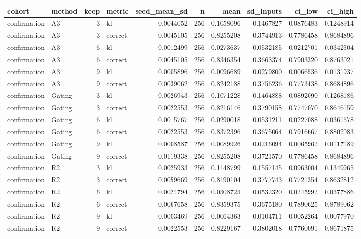 \begin{tabular}{llrlrrrrrr}
\toprule
cohort & method & keep & metric & seed_mean_sd & n & mean & sd_inputs & ci_low & ci_high \\
\midrule
confirmation & A3 & 3 & kl & 0.0044052 & 256 & 0.1058096 & 0.1467827 & 0.0876483 & 0.1248914 \\
confirmation & A3 & 3 & correct & 0.0045105 & 256 & 0.8255208 & 0.3744913 & 0.7786458 & 0.8684896 \\
confirmation & A3 & 6 & kl & 0.0012499 & 256 & 0.0273637 & 0.0532185 & 0.0212701 & 0.0342504 \\
confirmation & A3 & 6 & correct & 0.0045105 & 256 & 0.8346354 & 0.3663374 & 0.7903320 & 0.8763021 \\
confirmation & A3 & 9 & kl & 0.0005896 & 256 & 0.0096689 & 0.0279800 & 0.0066536 & 0.0131937 \\
confirmation & A3 & 9 & correct & 0.0039062 & 256 & 0.8242188 & 0.3756236 & 0.7773438 & 0.8684896 \\
confirmation & Gating & 3 & kl & 0.0026943 & 256 & 0.1071228 & 0.1464888 & 0.0892090 & 0.1268186 \\
confirmation & Gating & 3 & correct & 0.0022553 & 256 & 0.8216146 & 0.3790158 & 0.7747070 & 0.8646159 \\
confirmation & Gating & 6 & kl & 0.0015767 & 256 & 0.0290018 & 0.0531211 & 0.0227088 & 0.0361678 \\
confirmation & Gating & 6 & correct & 0.0022553 & 256 & 0.8372396 & 0.3675064 & 0.7916667 & 0.8802083 \\
confirmation & Gating & 9 & kl & 0.0008587 & 256 & 0.0089926 & 0.0216094 & 0.0065962 & 0.0117189 \\
confirmation & Gating & 9 & correct & 0.0119338 & 256 & 0.8255208 & 0.3721570 & 0.7786458 & 0.8684896 \\
confirmation & R2 & 3 & kl & 0.0025933 & 256 & 0.1148799 & 0.1557145 & 0.0963004 & 0.1349965 \\
confirmation & R2 & 3 & correct & 0.0059669 & 256 & 0.8190104 & 0.3777743 & 0.7721354 & 0.8632812 \\
confirmation & R2 & 6 & kl & 0.0024794 & 256 & 0.0308723 & 0.0532320 & 0.0245992 & 0.0377886 \\
confirmation & R2 & 6 & correct & 0.0067658 & 256 & 0.8359375 & 0.3675180 & 0.7890625 & 0.8789062 \\
confirmation & R2 & 9 & kl & 0.0003469 & 256 & 0.0064363 & 0.0104711 & 0.0052264 & 0.0077970 \\
confirmation & R2 & 9 & correct & 0.0022553 & 256 & 0.8229167 & 0.3802018 & 0.7760091 & 0.8671875 \\

\end{tabular}
